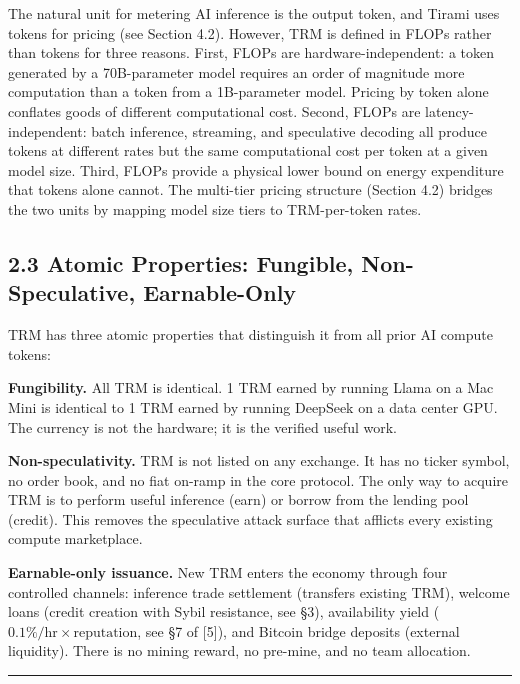 \documentclass[
  11pt,
]{article}
\begin{document}
The natural unit for metering AI inference is the output token, and
Tirami uses tokens for pricing (see Section 4.2). However, TRM is
defined in FLOPs rather than tokens for three reasons. First, FLOPs are
hardware-independent: a token generated by a 70B-parameter model
requires an order of magnitude more computation than a token from a
1B-parameter model. Pricing by token alone conflates goods of different
computational cost. Second, FLOPs are latency-independent: batch
inference, streaming, and speculative decoding all produce tokens at
different rates but the same computational cost per token at a given
model size. Third, FLOPs provide a physical lower bound on energy
expenditure that tokens alone cannot. The multi-tier pricing structure
(Section 4.2) bridges the two units by mapping model size tiers to
TRM-per-token rates.

\subsection{2.3 Atomic Properties: Fungible, Non-Speculative,
Earnable-Only}\label{atomic-properties-fungible-non-speculative-earnable-only}

TRM has three atomic properties that distinguish it from all prior AI
compute tokens:

\textbf{Fungibility.} All TRM is identical. 1 TRM earned by running
Llama on a Mac Mini is identical to 1 TRM earned by running DeepSeek on
a data center GPU. The currency is not the hardware; it is the verified
useful work.

\textbf{Non-speculativity.} TRM is not listed on any exchange. It has no
ticker symbol, no order book, and no fiat on-ramp in the core protocol.
The only way to acquire TRM is to perform useful inference (earn) or
borrow from the lending pool (credit). This removes the speculative
attack surface that afflicts every existing compute marketplace.

\textbf{Earnable-only issuance.} New TRM enters the economy through four
controlled channels: inference trade settlement (transfers existing
TRM), welcome loans (credit creation with Sybil resistance, see §3),
availability yield (\(0.1\%/\text{hr} \times \text{reputation}\), see §7
of {[}5{]}), and Bitcoin bridge deposits (external liquidity). There is
no mining reward, no pre-mine, and no team allocation.

\begin{center}\rule{0.5\linewidth}{0.5pt}\end{center}
\end{document}
